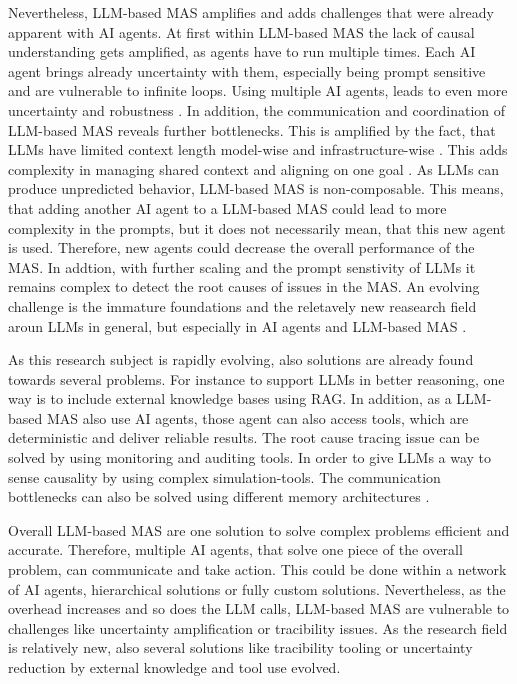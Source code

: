 \documentclass[a4paper,oneside,bibliography=totoc]{scrbook}
\begin{document}
Nevertheless, \ac{LLM}-based \ac{MAS} amplifies and adds challenges that were already apparent with \ac{AI} agents. At first within \ac{LLM}-based \ac{MAS} the lack of causal understanding gets amplified, as agents have to run multiple times. Each \ac{AI} agent brings already uncertainty with them, especially being prompt sensitive and are vulnerable to infinite loops. Using multiple \ac{AI} agents, leads to even more uncertainty and robustness \cite{Sapkota2025}. In addition, the communication and coordination of \ac{LLM}-based \ac{MAS} reveals further bottlenecks. This is amplified by the fact, that \acp{LLM} have limited context length model-wise and infrastructure-wise \cite{Kwon2023}. This adds complexity in managing shared context and aligning on one goal \cite{Sapkota2025,Han2025}. As \acp{LLM} can produce unpredicted behavior, \ac{LLM}-based \ac{MAS} is non-composable. This means, that adding another \ac{AI} agent to a \ac{LLM}-based \ac{MAS} could lead to more complexity in the prompts, but it does not necessarily mean, that this new agent is used. Therefore, new agents could decrease the overall performance of the \ac{MAS}. In addtion, with further scaling and the prompt senstivity of \acp{LLM} it remains complex to detect the root causes of issues in the \ac{MAS}. An evolving challenge is the immature foundations and the reletavely new reasearch field aroun \acp{LLM} in general, but especially in \ac{AI} agents and \ac{LLM}-based \ac{MAS} \cite{Sapkota2025}.

As this research subject is rapidly evolving, also solutions are already found towards several problems. For instance to support \acp{LLM} in better reasoning, one way is to include external knowledge bases using \ac{RAG}. In addition, as a \ac{LLM}-based \ac{MAS} also use \ac{AI} agents, those agent can also access tools, which are deterministic and deliver reliable results. The root cause tracing issue can be solved by using monitoring and auditing tools. In order to give \acp{LLM} a way to sense causality by using complex simulation-tools. The communication bottlenecks can also be solved using different memory architectures \cite{Sapkota2025}.

Overall \ac{LLM}-based \ac{MAS} are one solution to solve complex problems efficient and accurate. Therefore, multiple \ac{AI} agents, that solve one piece of the overall problem, can communicate and take action. This could be done within a network of \ac{AI} agents, hierarchical solutions or fully custom solutions. Nevertheless, as the overhead increases and so does the \ac{LLM} calls, \ac{LLM}-based \ac{MAS} are vulnerable to challenges like uncertainty amplification or tracibility issues. As the research field is relatively new, also several solutions like tracibility tooling or uncertainty reduction by external knowledge and tool use evolved.
\end{document}
